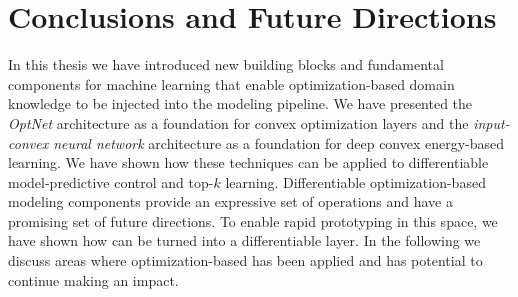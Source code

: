 \chapter{Conclusions and Future Directions}
\label{sec:conclusions}

In this thesis we have introduced new building blocks and
fundamental components for machine learning that enable
optimization-based domain knowledge to be injected
into the modeling pipeline.
We have presented the \emph{OptNet} architecture as a
foundation for convex optimization layers and the
\emph{input-convex neural network} architecture as a
foundation for deep convex energy-based learning.
We have shown how these techniques can be applied to
differentiable model-predictive control and
top-$k$ learning.
Differentiable optimization-based modeling components
provide an expressive set of operations and
have a promising set of future directions.
To enable rapid prototyping in this space, we have shown
how \cvxpy can be turned into a differentiable layer.
In the following we discuss areas where optimization-based
has been applied and has potential to continue making
an impact.

